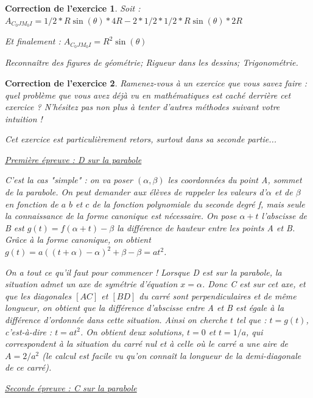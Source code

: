 \documentclass[12pt]{article}
\theoremstyle{break}
\newtheorem{cor}{Correction de l'exercice}
\begin{document}
\begin{cor}
Soit : $A_{C_0 J M_0 I} = 1/2 * R \sin(\theta) * 4R - 2 * 1/2 * 1/2 * R \sin(\theta) * 2R$

Et finalement : $A_{C_0 J M_0 I} = R^2 \sin(\theta)$\newline 

\textit{Reconnaître des figures de géométrie; Rigueur dans les dessins; Trigonométrie.}
\end{cor}


\begin{cor}
\textit{Ramenez-vous à un exercice que vous savez faire : quel problème que vous avez déjà vu en mathématiques est caché derrière cet exercice ? N'hésitez pas non plus à tenter d'autres méthodes suivant votre intuition !}

Cet exercice est particulièrement retors, surtout dans sa seconde partie...
\newline

\underline{Première épreuve : D sur la parabole}

C'est la cas "simple" : on va poser $(\alpha,\beta)$ les coordonnées du point A, sommet de la parabole. On peut demander aux élèves de rappeler les valeurs d'$\alpha$ et de $\beta$ en fonction de $a$ $b$ et $c$ de la fonction polynomiale du seconde degré f, mais seule la connaissance de la forme canonique est nécessaire. On pose $\alpha + t$ l'abscisse de B est $g(t) = f(\alpha + t) - \beta$ la différence de hauteur entre les points A et B. Grâce à la forme canonique, on obtient $g(t) = a((t+\alpha)-\alpha)^2+\beta - \beta = a t^2$.

On a tout ce qu'il faut pour commencer ! Lorsque D est sur la parabole, la situation admet un axe de symétrie d'équation $x = \alpha$. Donc C est sur cet axe, et que les diagonales $[AC]$ et $[BD]$ du carré sont perpendiculaires et de même longueur, on obtient que la différence d'abscisse entre A et B est égale à la différence d'ordonnée dans cette situation. Ainsi on cherche $t$ tel que : $t = g(t)$, c'est-à-dire : $t = a t^2$. On obtient deux solutions, $t = 0$ et $t = 1/a$, qui correspondent à la situation du carré nul et à celle où le carré a une aire de $A = 2/a^2$ (le calcul est facile vu qu'on connaît la longueur de la demi-diagonale de ce carré).
\newline

\underline{Seconde épreuve : C sur la parabole}


\end{cor}
\end{document}
